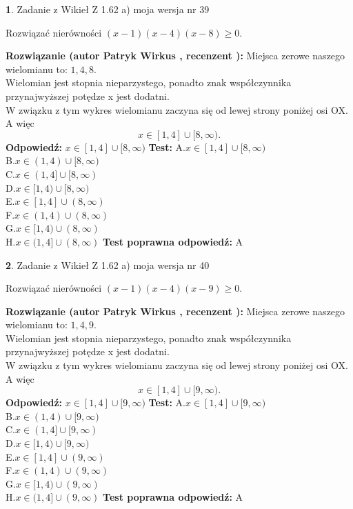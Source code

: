 \documentclass[12pt, a4paper]{article}
\theoremstyle{definition} %
\newtheorem{zad}{}
\newcommand{\zadStart}[1]{\begin{zad}#1\newline}
\newcommand{\zadStop}{\end{zad}}
\newcommand{\rozwStart}[2]{\noindent \textbf{Rozwiązanie (autor #1 , recenzent #2): }\newline}
\newcommand{\rozwStop}{\newline}
\newcommand{\odpStart}{\noindent \textbf{Odpowiedź:}\newline}
\newcommand{\odpStop}{\newline}
\newcommand{\testStart}{\noindent \textbf{Test:}\newline}
\newcommand{\testStop}{\newline}
\newcommand{\kluczStart}{\noindent \textbf{Test poprawna odpowiedź:}\newline}
\newcommand{\kluczStop}{\newline}
\begin{document}
\zadStart{Zadanie z Wikieł Z 1.62 a) moja wersja nr 39}

Rozwiązać nierówności $(x-1)(x-4)(x-8)\ge0$.
\zadStop
\rozwStart{Patryk Wirkus}{}
Miejsca zerowe naszego wielomianu to: $1, 4, 8$.\\
Wielomian jest stopnia nieparzystego, ponadto znak współczynnika przy\linebreak najwyższej potędze x jest dodatni.\\ W związku z tym wykres wielomianu zaczyna się od lewej strony poniżej osi OX. A więc $$x \in [1,4] \cup [8,\infty).$$
\rozwStop
\odpStart
$x \in [1,4] \cup [8,\infty)$
\odpStop
\testStart
A.$x \in [1,4] \cup [8,\infty)$\\
B.$x \in (1,4) \cup [8,\infty)$\\
C.$x \in (1,4] \cup [8,\infty)$\\
D.$x \in [1,4) \cup [8,\infty)$\\
E.$x \in [1,4] \cup (8,\infty)$\\
F.$x \in (1,4) \cup (8,\infty)$\\
G.$x \in [1,4) \cup (8,\infty)$\\
H.$x \in (1,4] \cup (8,\infty)$
\testStop
\kluczStart
A
\kluczStop



\zadStart{Zadanie z Wikieł Z 1.62 a) moja wersja nr 40}

Rozwiązać nierówności $(x-1)(x-4)(x-9)\ge0$.
\zadStop
\rozwStart{Patryk Wirkus}{}
Miejsca zerowe naszego wielomianu to: $1, 4, 9$.\\
Wielomian jest stopnia nieparzystego, ponadto znak współczynnika przy\linebreak najwyższej potędze x jest dodatni.\\ W związku z tym wykres wielomianu zaczyna się od lewej strony poniżej osi OX. A więc $$x \in [1,4] \cup [9,\infty).$$
\rozwStop
\odpStart
$x \in [1,4] \cup [9,\infty)$
\odpStop
\testStart
A.$x \in [1,4] \cup [9,\infty)$\\
B.$x \in (1,4) \cup [9,\infty)$\\
C.$x \in (1,4] \cup [9,\infty)$\\
D.$x \in [1,4) \cup [9,\infty)$\\
E.$x \in [1,4] \cup (9,\infty)$\\
F.$x \in (1,4) \cup (9,\infty)$\\
G.$x \in [1,4) \cup (9,\infty)$\\
H.$x \in (1,4] \cup (9,\infty)$
\testStop
\kluczStart
A
\kluczStop
\end{document}
